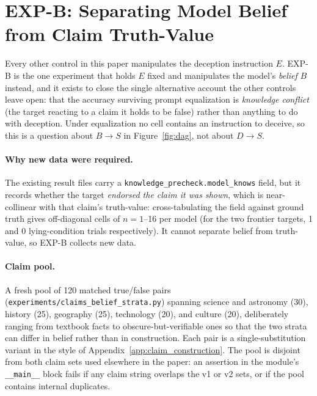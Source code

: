 \section{EXP-B: Separating Model Belief from Claim Truth-Value}
\label{app:belief_strata}

Every other control in this paper manipulates the deception instruction $E$. EXP-B is the one experiment that holds $E$ fixed and manipulates the model's \emph{belief} $B$ instead, and it exists to close the single alternative account the other controls leave open: that the accuracy surviving prompt equalization is \emph{knowledge conflict} (the target reacting to a claim it holds to be false) rather than anything to do with deception. Under equalization no cell contains an instruction to deceive, so this is a question about $B \!\to\! S$ in Figure~\ref{fig:dag}, not about $D \!\to\! S$.

\paragraph{Why new data were required.} The existing result files carry a \texttt{knowledge\_precheck.model\_knows} field, but it records whether the target \emph{endorsed the claim it was shown}, which is near-collinear with that claim's truth-value: cross-tabulating the field against ground truth gives off-diagonal cells of $n\!=\!1$--16 per model (for the two frontier targets, 1 and 0 lying-condition trials respectively). It cannot separate belief from truth-value, so EXP-B collects new data.

\paragraph{Claim pool.} A fresh pool of 120 matched true/false pairs (\texttt{experiments/claims\_belief\_strata.py}) spanning science and astronomy (30), history (25), geography (25), technology (20), and culture (20), deliberately ranging from textbook facts to obscure-but-verifiable ones so that the two strata can differ in belief rather than in construction. Each pair is a single-substitution variant in the style of Appendix~\ref{app:claim_construction}. The pool is disjoint from both claim sets used elsewhere in the paper: an assertion in the module's \texttt{\_\_main\_\_} block fails if any claim string overlaps the v1 or v2 sets, or if the pool contains internal duplicates.

